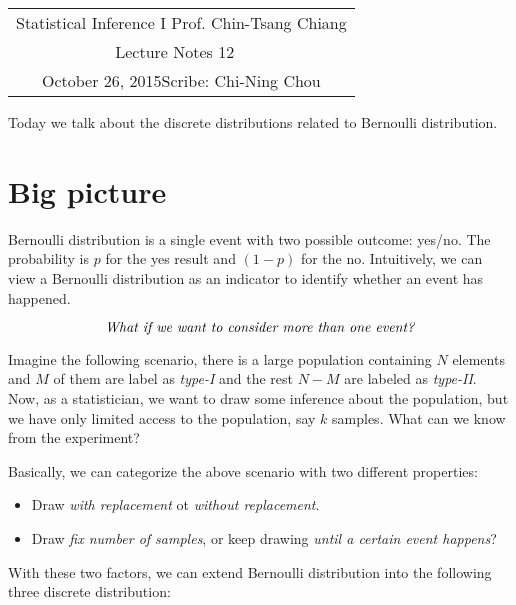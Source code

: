 \documentclass[11pt]{article}
\newcommand{\scribe}{Chi-Ning Chou}
\newcommand{\lecnum}{12}
\newcommand{\lecdate}{October 26, 2015}
\begin{document}
	
	\begin{center}
		\renewcommand{\arraystretch}{2}
		\begin{bfseries}
			\begin{tabular}{|c|}
				\hline
				Statistical Inference I \hfill Prof. Chin-Tsang Chiang\\
				\hspace{15em} {\large Lecture Notes \lecnum} \hspace{15em}\ \\
				\lecdate \hfill Scribe: \scribe\\
				\hline
			\end{tabular}
			\renewcommand{\arraystretch}{1}
		\end{bfseries}
	\end{center}
	
	
Today we talk about the discrete distributions related to Bernoulli distribution.
\section{Big picture}
Bernoulli distribution is a single event with two possible outcome: yes/no. The probability is $p$ for the yes result and $(1-p)$ for the no. Intuitively, we can view a Bernoulli distribution as an indicator to identify whether an event has happened.

$$\mbox{\it What if we want to consider more than one event?}$$

Imagine the following scenario, there is a large population containing $N$ elements and $M$ of them are label as {\it type-I} and the rest $N-M$ are labeled as {\it type-II}. Now, as a statistician, we want to draw some inference about the population, but we have only limited access to the population, say $k$ samples. What can we know from the experiment?

Basically, we can categorize the above scenario with two different properties: 
\begin{itemize}
	\item Draw {\it with replacement} ot {\it without replacement}.
	\item Draw {\it fix number of samples}, or keep drawing {\it until a certain event happens}?
\end{itemize}

With these two factors, we can extend Bernoulli distribution into the following three discrete distribution:
\end{document}
